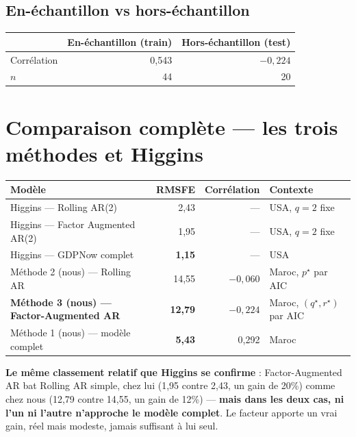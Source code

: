 \documentclass[11pt,a4paper]{article}
\begin{document}
\subsection{En-échantillon vs hors-échantillon}

\begin{resultatbox}
\begin{center}
\begin{tabular}{lrr}
\toprule
& \textbf{En-échantillon (train)} & \textbf{Hors-échantillon (test)} \\
\midrule
Corrélation & 0,543 & $-0{,}224$ \\
$n$ & 44 & 20 \\
\bottomrule
\end{tabular}
\end{center}
\end{resultatbox}

\section{Comparaison complète --- les trois méthodes et Higgins}

\begin{center}
\small
\begin{tabular}{lrrl}
\toprule
\textbf{Modèle} & \textbf{RMSFE} & \textbf{Corrélation} & \textbf{Contexte} \\
\midrule
Higgins --- Rolling AR(2) & 2,43 & --- & USA, $q=2$ fixe \\
Higgins --- Factor Augmented AR(2) & 1,95 & --- & USA, $q=2$ fixe \\
Higgins --- GDPNow complet & \textbf{1,15} & --- & USA \\
\midrule
Méthode 2 (nous) --- Rolling AR & 14,55 & $-0{,}060$ & Maroc, $p^\star$ par AIC \\
\textbf{Méthode 3 (nous) --- Factor-Augmented AR} & \textbf{12,79} & $-0{,}224$ & Maroc, $(q^\star,r^\star)$ par AIC \\
Méthode 1 (nous) --- modèle complet & \textbf{5,43} & 0,292 & Maroc \\
\bottomrule
\end{tabular}
\end{center}

\begin{resultatbox}
\textbf{Le même classement relatif que Higgins se confirme} : Factor-Augmented AR bat Rolling AR simple, chez lui (1,95 contre 2,43, un gain de 20\%) comme chez nous (12,79 contre 14,55, un gain de 12\%) --- \textbf{mais dans les deux cas, ni l'un ni l'autre n'approche le modèle complet}. Le facteur apporte un vrai gain, réel mais modeste, jamais suffisant à lui seul.
\end{resultatbox}
\end{document}
